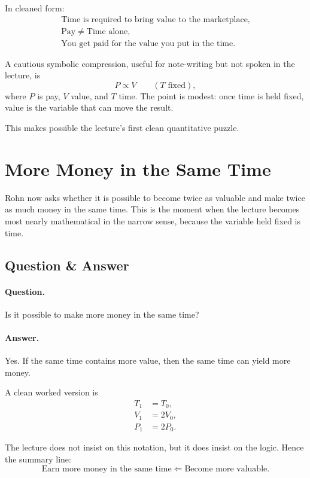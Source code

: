 In cleaned form:
\begin{align}
\text{Time is required to bring value to the marketplace},\\
\text{Pay} \neq \text{Time alone},\\
\text{You get paid for the value you put in the time}.
\end{align}

A cautious symbolic compression, useful for note-writing but not spoken in the lecture, is
\begin{equation}
P \propto V \qquad (T \text{ fixed}),
\end{equation}
where \(P\) is pay, \(V\) value, and \(T\) time. The point is modest: once time is held fixed, value is the variable that can move the result.

This makes possible the lecture's first clean quantitative puzzle.

\section{More Money in the Same Time}

Rohn now asks whether it is possible to become twice as valuable and make twice as much money in the same time. This is the moment when the lecture becomes most nearly mathematical in the narrow sense, because the variable held fixed is time.

\subsection{Question \& Answer}

\paragraph{Question.} Is it possible to make more money in the same time?

\paragraph{Answer.} Yes. If the same time contains more value, then the same time can yield more money.

A clean worked version is
\begin{align}
T_{1} &= T_{0},\\
V_{1} &= 2V_{0},\\
P_{1} &= 2P_{0}.
\end{align}

The lecture does not insist on this notation, but it does insist on the logic. Hence the summary line:
\begin{equation}
\text{Earn more money in the same time} \Longleftarrow \text{Become more valuable}.
\end{equation}

